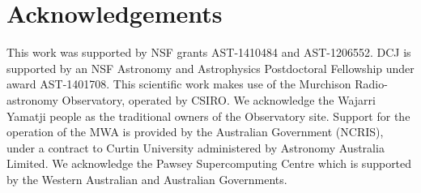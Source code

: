 \documentclass[iop]{emulateapj}
\begin{document}
\section{Acknowledgements}
This work was supported by NSF grants AST-1410484 and AST-1206552.
DCJ is supported by an NSF Astronomy and Astrophysics Postdoctoral Fellowship
under award AST-1401708.
This scientific work makes use of the Murchison Radio-astronomy Observatory, operated by 
CSIRO. We acknowledge the Wajarri Yamatji people as the traditional owners of the 
Observatory site. Support for the operation of the MWA is provided by the Australian 
Government (NCRIS), under a contract to Curtin University administered by Astronomy 
Australia Limited. We acknowledge the Pawsey Supercomputing Centre which is supported 
by the Western Australian and Australian Governments.


\end{document}
